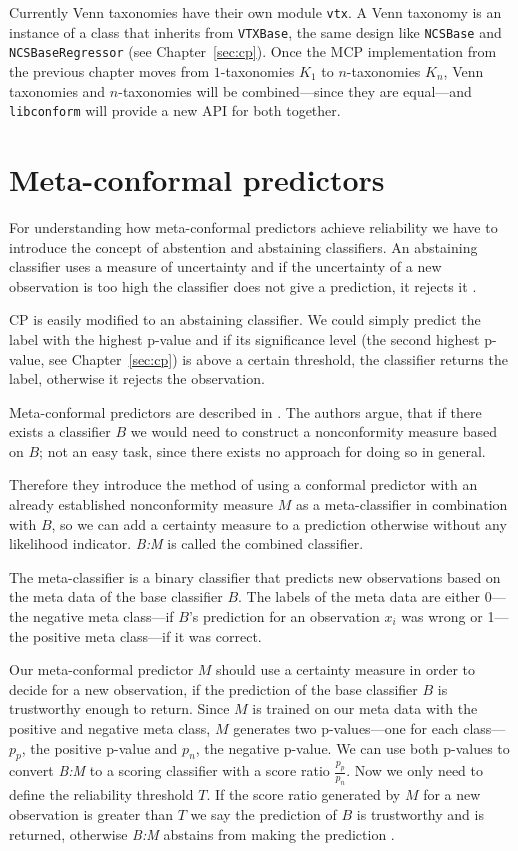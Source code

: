 \documentclass[twoside,11pt]{article}
\def\libconform{\texttt{libconform}}
\begin{document}
Currently Venn taxonomies have their own module
\texttt{vtx}. A Venn taxonomy is an instance of a class
that inherits from \texttt{VTXBase}, the same design
like \texttt{NCSBase} and \texttt{NCSBase\-Re\-gres\-sor}
(see Chapter~\ref{sec:cp}).
Once the MCP implementation from the previous chapter moves
from $1$-taxonomies $K_1$ to $n$-taxonomies $K_n$, Venn
taxonomies and $n$-taxonomies will be combined---since they
are equal---and \libconform{} will provide a new API for
both together.

\section{Meta-conformal predictors}
\label{sec:meta}

For understanding how meta-conformal predictors achieve
reliability we have to introduce the concept of abstention
and abstaining classifiers.
An abstaining classifier uses a measure of uncertainty and
if the uncertainty of a new observation is too high the
classifier does not give a prediction, it rejects it
\citep[see][]{vanderlooy_et_al_2009}.

CP is easily modified to an abstaining classifier.
We could simply predict the label with the highest
p-value and if its significance level (the second highest
p-value, see Chapter~\ref{sec:cp}) is above a certain
threshold, the classifier returns the label, otherwise it
rejects the observation.

Meta-conformal predictors are described in
\citet{smirnov_et_al_2009}. The authors argue, that if
there exists a classifier $B$ we would need to construct
a nonconformity measure based on $B$; not an easy task,
since there exists no approach for doing so in general.

Therefore they introduce the method of using a conformal
predictor with an already established nonconformity measure
$M$ as a meta-classifier in combination with $B$, so we can
add a certainty measure to a prediction otherwise without
any likelihood indicator.
\textit{B:M} is called the combined classifier.

The meta-classifier is a binary classifier that predicts
new observations based on the meta data of the base
classifier $B$. The labels of the meta data are either
0---the negative meta class---if $B$'s prediction
for an observation $x_i$ was wrong or 1---the positive
meta class---if it was correct.

Our meta-conformal predictor $M$ should use a certainty
measure in order to decide for a new observation, if the
prediction of the base classifier $B$ is trustworthy enough
to return. Since $M$ is trained on our meta data with the
positive and negative meta class, $M$ generates two
p-values---one for each class---$p_p$, the positive p-value
and $p_n$, the negative p-value.
We can use both p-values to convert \textit{B:M} to a
scoring classifier with a score ratio $\frac{p_p}{p_n}$.
Now we only need to define the reliability threshold $T$.
If the score ratio generated by $M$ for a new observation
is greater than $T$ we say the prediction of $B$ is
trustworthy and is returned, otherwise \textit{B:M}
abstains from making the prediction
\citep[see][]{smirnov_et_al_2009}.
\\
\end{document}
